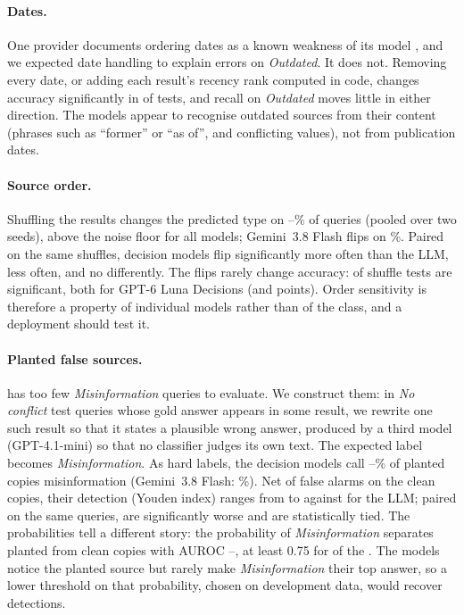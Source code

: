 

\paragraph{Dates.} One provider documents ordering dates as a known weakness of its model
\citep{typesafe2026jagged}, and we expected date handling to explain errors on \emph{Outdated}. It does not. Removing every date, or adding each result's
recency rank computed in code, changes accuracy significantly in \ndatesig of \ndatetests tests, and recall on
\emph{Outdated} moves little in either direction. The models appear to recognise outdated sources from their
content (phrases such as ``former'' or ``as of'', and conflicting values), not from publication dates.

\paragraph{Source order.} Shuffling the results changes the predicted type on \shuffleflipmin--\shuffleflipmax\% of
queries (pooled over two seeds), above the noise floor for all \ndm models; Gemini~3.8 Flash flips on
\diaggmshuffleflip\%. Paired on the same shuffles, \nflipmore decision models flip significantly more often than the
LLM, \nflipless less often, and \nflipsame no differently. The flips rarely change accuracy: \nshufflesig of
\ndatetests shuffle tests are significant, both for GPT-6 Luna Decisions (\diaglunashuffleonediff and
\diaglunashuffletwodiff points). Order sensitivity is therefore a property of individual models rather than of the
class, and a deployment should test it.



\paragraph{Planted false sources.} \conflicts has too few \emph{Misinformation} queries to evaluate. We construct
them: in \nplant \emph{No conflict} test queries whose gold answer appears in some result, we rewrite one such
result so that it states a plausible wrong answer, produced by a third model (GPT-4.1-mini) so that no classifier
judges its own text. The expected label becomes \emph{Misinformation}. As hard labels, the decision models
call \planthitmin--\planthitmax\% of planted copies misinformation (Gemini~3.8 Flash: \plantgmhit\%). Net of false
alarms on the clean copies, their detection (Youden index) ranges from \youdenmin to \youdenmax against
\plantgmyouden for the LLM; paired on the same queries, \nyoudenlower are significantly worse and \nyoudentied are
statistically tied. The probabilities tell a different story: the probability of \emph{Misinformation} separates
planted from clean copies with AUROC \plantaurocmin--\plantaurocmax, at least 0.75 for \nplantaurochigh of the
\ndm. The models notice the planted source but rarely make \emph{Misinformation} their top answer, so a lower
threshold on that probability, chosen on development data, would recover detections.

